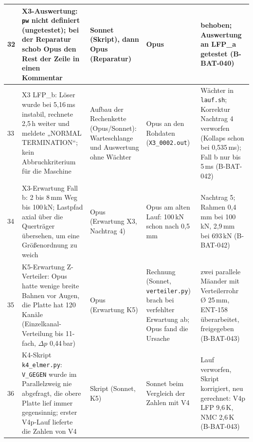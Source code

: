 \documentclass[10pt,a4paper]{article}
\begin{document}
\begin{longtable}{@{}p{0.4cm}p{3.6cm}p{2.5cm}p{4.4cm}p{3.0cm}@{}}
32 & X3-Auswertung: \texttt{pw} nicht definiert (ungetestet); bei der Reparatur schob Opus den Rest der Zeile in einen Kommentar & Sonnet (Skript), dann Opus (Reparatur)
 & Opus & behoben; Auswertung an LFP\_a getestet (B-BAT-040)\\
\midrule
33 & X3 LFP\_b: Löser wurde bei 5,16\,ms instabil, rechnete 2,5\,h weiter und meldete „NORMAL TERMINATION“; kein Abbruchkriterium für die Maschine & Aufbau der Rechenkette (Opus/Sonnet): Warteschlange und Auswertung ohne Wächter
 & Opus an den Rohdaten (\texttt{X3\_0002.out}) & Wächter in \texttt{lauf.sh}; Korrektur Nachtrag 4 verworfen (Kollaps schon bei 0,535\,ms); Fall b nur bis 5\,ms (B-BAT-042)\\
34 & X3-Erwartung Fall b: 2 bis 8\,mm Weg bis 100\,kN; Lastpfad axial über die Querträger übersehen, um eine Größenordnung zu weich & Opus (Erwartung X3, Nachtrag 4)
 & Opus am alten Lauf: 100\,kN schon nach 0,5\,mm & Nachtrag 5; Rahmen 0,4\,mm bei 100\,kN, 2,9\,mm bei 693\,kN (B-BAT-042)\\
35 & K5-Erwartung Z-Verteiler: Opus hatte wenige breite Bahnen vor Augen, die Platte hat 120 Kanäle (Einzelkanal-Verteilung bis 11-fach, $\Delta p$ 0,44\,bar) & Opus (Erwartung K5)
 & Rechnung (Sonnet, \texttt{verteiler.py}) brach bei verfehlter Erwartung ab; Opus fand die Ursache & zwei parallele Mäander mit Verteilerrohr Ø 25\,mm, ENT-158 überarbeitet, freigegeben (B-BAT-043)\\
36 & K4-Skript \texttt{k4\_elmer.py}: \texttt{V\_GEGEN} wurde im Parallelzweig nie abgefragt, die obere Platte lief immer gegensinnig; erster V4p-Lauf lieferte die Zahlen von V4 & Skript (Sonnet, K5)
 & Sonnet beim Vergleich der Zahlen mit V4 & Lauf verworfen, Skript korrigiert, neu gerechnet: V4p LFP 9,6\,K, NMC 2,6\,K (B-BAT-043)\\
\bottomrule
\end{longtable}
\end{document}
